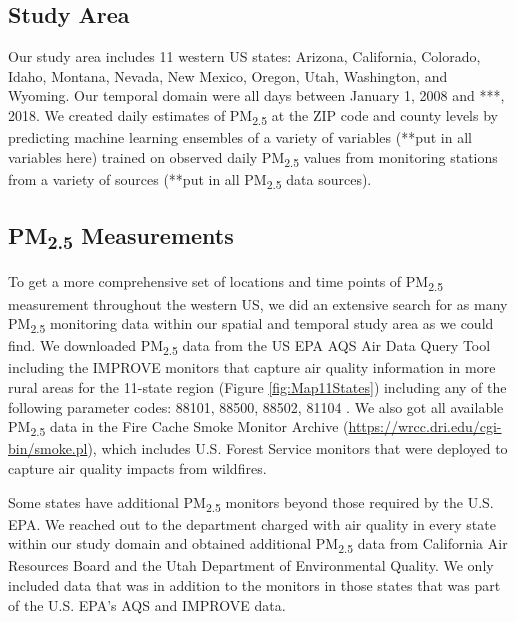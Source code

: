 \documentclass[english]{article}
\begin{document}
\subsection*{Study Area}

Our study area includes 11 western US states: Arizona, California, Colorado, Idaho, Montana, Nevada, New Mexico, Oregon, Utah, Washington, and Wyoming. Our temporal domain were all days between January 1, 2008 and ***, 2018. We created daily estimates of PM\textsubscript{2.5} at the ZIP code and county levels by predicting machine learning ensembles of a variety of variables (**put in all variables here) trained on observed daily PM\textsubscript{2.5} values from monitoring stations from a variety of sources (**put in all PM\textsubscript{2.5} data sources). 


\subsection*{PM\textsubscript{2.5} Measurements}
To get a more comprehensive set of locations and time points of PM\textsubscript{2.5} measurement throughout the western US, we did an extensive search for as many PM\textsubscript{2.5} monitoring data within our spatial and temporal study area as we could find. We downloaded PM\textsubscript{2.5} data from the US EPA AQS Air Data Query Tool \cite{EPAAirData2017} including the IMPROVE monitors that capture air quality information in 
more rural areas \cite{EPANPM25IMPROVE2017} for the 11-state region (Figure \ref{fig:Map11States}) including any of the following parameter codes: 88101, 88500, 88502, 81104 \cite{EPANPM25Memo2017,EPANPM25Parameters2017,EPANAllParameters2017}. We also got all available PM\textsubscript{2.5} data in the Fire Cache Smoke Monitor Archive (\url{https://wrcc.dri.edu/cgi-bin/smoke.pl}), which includes U.S. Forest Service monitors that were deployed to capture air quality impacts from wildfires. 

Some states have additional PM\textsubscript{2.5} monitors beyond those required by the U.S. EPA. We reached out to the department charged with air quality in every state within our study domain and obtained additional PM\textsubscript{2.5} data from California Air Resources Board and the Utah Department of Environmental Quality. We only included data that was in addition to the monitors in those states that was part of the U.S. EPA's AQS and IMPROVE data.   
\end{document}
